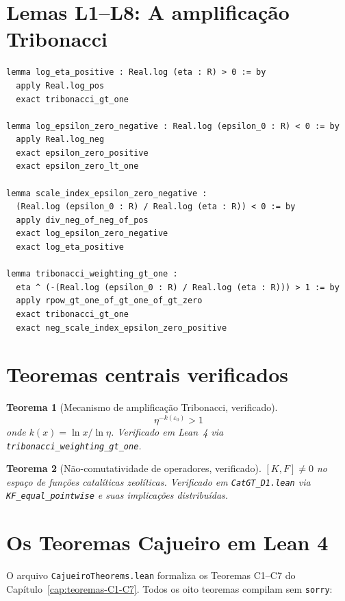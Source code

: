 \documentclass[12pt,a4paper,twoside]{book}
\theoremstyle{plain}
\newtheorem{teorema}{Teorema}[section]
\theoremstyle{definition}
\theoremstyle{definition}
\newcommand{\epsz}{\varepsilon_{0}}
\newcommand{\tribo}{\eta}
\begin{document}
\section{Lemas L1--L8: A amplificação Tribonacci}

\begin{lstlisting}[language=lean]
lemma log_eta_positive : Real.log (eta : R) > 0 := by
  apply Real.log_pos
  exact tribonacci_gt_one

lemma log_epsilon_zero_negative : Real.log (epsilon_0 : R) < 0 := by
  apply Real.log_neg
  exact epsilon_zero_positive
  exact epsilon_zero_lt_one

lemma scale_index_epsilon_zero_negative :
  (Real.log (epsilon_0 : R) / Real.log (eta : R)) < 0 := by
  apply div_neg_of_neg_of_pos
  exact log_epsilon_zero_negative
  exact log_eta_positive

lemma tribonacci_weighting_gt_one :
  eta ^ (-(Real.log (epsilon_0 : R) / Real.log (eta : R))) > 1 := by
  apply rpow_gt_one_of_gt_one_of_gt_zero
  exact tribonacci_gt_one
  exact neg_scale_index_epsilon_zero_positive
\end{lstlisting}

\section{Teoremas centrais verificados}

\begin{teorema}[Mecanismo de amplificação Tribonacci, verificado]\label{thm:lean-tribo}
\[
  \tribo^{-k(\epsz)} > 1
\]
onde $k(x) = \ln x / \ln \tribo$. Verificado em Lean~4 via
\texttt{tribonacci\_weighting\_gt\_one}.
\end{teorema}

\begin{teorema}[Não-comutatividade de operadores, verificado]\label{thm:lean-noncomm}
$[K,F] \ne 0$ no espaço de funções catalíticas zeolíticas. Verificado
em \texttt{CatGT\_D1.lean} via \texttt{KF\_equal\_pointwise} e suas
implicações distribuídas.
\end{teorema}

\section{Os Teoremas Cajueiro em Lean 4}
\label{sec:lean-cajueiro}

O arquivo \texttt{CajueiroTheorems.lean} formaliza os Teoremas C1--C7 do
Capítulo~\ref{cap:teoremas-C1-C7}. Todos os oito teoremas compilam sem
\texttt{sorry}:
\end{document}
